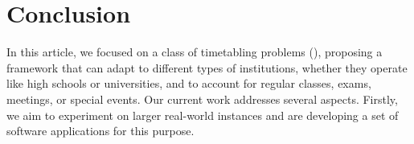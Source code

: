 \section{Conclusion}
\label{sec:conclusion}

In this article, we focused on a class of timetabling problems (\UTP{}), proposing a framework that can adapt to different types of institutions, whether they operate like high schools %
or %
universities, and to account for regular classes, exams, meetings, or special events.
Our current work addresses several aspects. Firstly, we aim to experiment on larger real-world instances and are developing a set of software applications for this purpose. 
